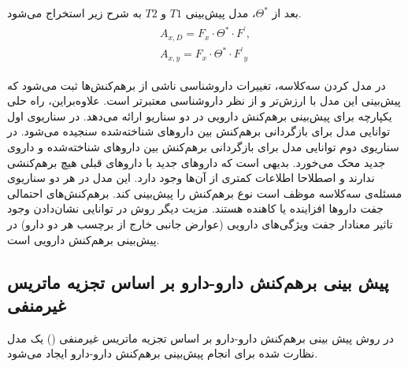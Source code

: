 بعد از
$\Theta^*$،
مدل پیش‌بینی
$T1$
و
$T2$
به شرح زیر استخراج می‌شود.
\begin{equation}
\begin{aligned}
\begin{split}
A_{x,D}={F_x \cdot {\Theta^*}\cdot{F^\prime}},
\\
A_{x,y}={F_x \cdot {\Theta^*}\cdot{F^\prime}_y}
\end{split}
\end{aligned}
\end{equation}

در مدل کردن سه‌کلاسه، تغییرات داروشناسی ناشی از برهم‌کنش‌ها ثبت می‌شود که پیش‌بینی این مدل با ارزش‌تر و از نظر داروشناسی معتبرتر است. علاوه‌براین، راه حلی یکپارچه برای پیش‌بینی برهم‌کنش دارویی در دو سناریو ارائه می‌دهد. در سناریوی اول توانایی مدل برای بازگردانی برهم‌کنش بین داروهای شناخته‌شده سنجیده می‌شود. در سناریوی دوم توانایی مدل برای بازگردانی برهم‌کنش بین داروهای شناخته‌شده و داروی جدید محک می‌خورد. بدیهی است که داروهای جدید با داروهای قبلی هیچ برهم‌کنشی ندارند و اصطلاحا اطلاعات کمتری از آن‌ها وجود دارد. این مدل در هر دو سناریوی مسئله‌ی سه‌کلاسه موظف است نوع برهم‌کنش را پیش‌بینی کند. برهم‌کنش‌های احتمالی جفت داروها افزاینده یا کاهنده هستند. مزیت دیگر روش 
در توانایی نشان‌دادن وجود تاثیر معنادار جفت ویژگی‌های دارویی (عوارض جانبی خارج از برچسب هر دو دارو) در پیش‌بینی برهم‌کنش دارویی است.

\subsection{
پیش بینی برهم‌کنش دارو-دارو بر اساس تجزیه ماتریس غیرمنفی}

در روش پیش بینی برهم‌کنش دارو-دارو بر اساس تجزیه ماتریس غیرمنفی
 ()
یک مدل نظارت شده برای انجام پیش‌بینی برهم‌کنش دارو-دارو ایجاد می‌شود.
\cite{Yu H2018}

